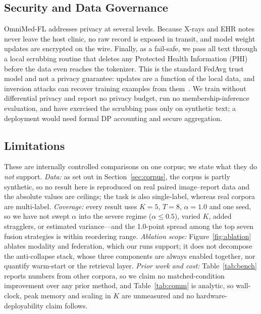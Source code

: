 \documentclass[letterpaper, conference]{IEEEtran}
\begin{document}
\subsection{Security and Data Governance}
OmniMed-FL addresses privacy at several levels. Because X-rays and EHR notes never leave the host clinic, no raw record is exposed in transit, and model weight updates are encrypted on the wire. Finally, as a fail-safe, we pass all text through a local scrubbing routine that deletes any Protected Health Information (PHI) before the data even reaches the tokenizer. This is the standard FedAvg trust model and not a privacy guarantee: updates are a function of the local data, and inversion attacks can recover training examples from them~\cite{Abadi2016}. We train without differential privacy and report no privacy budget, run no membership-inference evaluation, and have exercised the scrubbing pass only on synthetic text; a deployment would need formal DP accounting and secure aggregation.




\subsection{Limitations}
\label{sec:limits}
These are internally controlled comparisons on one corpus; we state what they do
\emph{not} support. \textit{Data:} as set out in Section~\ref{sec:corpus}, the
corpus is partly synthetic, so no result here is reproduced on real paired
image--report data and the absolute values are ceilings; the task is also
single-label, whereas real corpora are multi-label. \textit{Coverage:} every result uses $K{=}5$, $T{=}8$,
$\alpha{=}1.0$ and one seed, so we have not swept $\alpha$ into the severe regime
($\alpha\!\leq\!0.5$), varied $K$, added stragglers, or estimated variance---and the
1.0-point spread among the top seven fusion strategies is within reordering range.
\textit{Ablation scope:} Figure~\ref{fig:ablation} ablates modality and federation,
which our runs support; it does not decompose the anti-collapse stack, whose three
components are always enabled together, nor quantify warm-start or the retrieval
layer. \textit{Prior work and cost:} Table~\ref{tab:bench} reports numbers from other
corpora, so we claim no matched-condition improvement over any prior method, and
Table~\ref{tab:comm} is analytic, so wall-clock, peak memory and scaling in $K$ are
unmeasured and no hardware-deployability claim follows.
\end{document}
